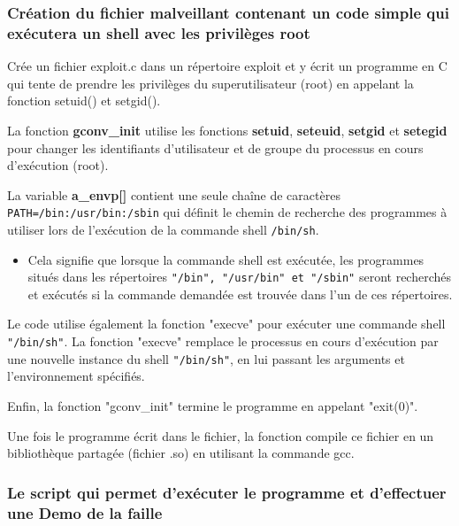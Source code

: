 \documentclass[12pt,a4paper]{article}
\newcommand{\code}[1]{\colorbox{light-gray}{\texttt{#1}}}
\begin{document}
            \subsubsection{Création du fichier malveillant contenant un code simple qui exécutera un shell avec les privilèges root}
              
            \begin{flushleft}
                \noindent Crée un fichier exploit.c dans un répertoire exploit et y écrit un programme en C qui tente de prendre les privilèges du superutilisateur (root) en appelant la fonction setuid() et setgid(). 
                
               \item La fonction \textbf{gconv\_init} utilise les fonctions \textbf{setuid}, \textbf{seteuid}, \textbf{setgid} et \textbf{setegid} pour changer les identifiants d'utilisateur et de groupe du processus en cours d'exécution (root).
               \item La variable \textbf{a\_envp[]} contient une seule chaîne de caractères \code{PATH=/bin:/usr/bin:/sbin} qui définit le chemin de recherche des programmes à utiliser lors de l'exécution de la commande shell \code{/bin/sh}. 
               \begin{itemize}
                   \item Cela signifie que lorsque la commande shell est exécutée, les programmes situés dans les répertoires \code{"/bin", "/usr/bin" et "/sbin"} seront recherchés et exécutés si la commande demandée est trouvée dans l'un de ces répertoires. 
               \end{itemize}
               
               \item Le code utilise également la fonction "execve" pour exécuter une commande shell \code{"/bin/sh"}. La fonction "execve" remplace le processus en cours d'exécution par une nouvelle instance du shell \code{"/bin/sh"}, en lui passant les arguments et l'environnement spécifiés. \item Enfin, la fonction "gconv\_init" termine le programme en appelant "exit(0)".
                \item Une fois le programme écrit dans le fichier, la fonction compile ce fichier en un bibliothèque partagée (fichier .so) en utilisant la commande gcc.
            \end{flushleft}
            
			\subsubsection{Le script qui permet d'exécuter le programme et d'effectuer une Demo de la faille} 
			  
   
\end{document}
